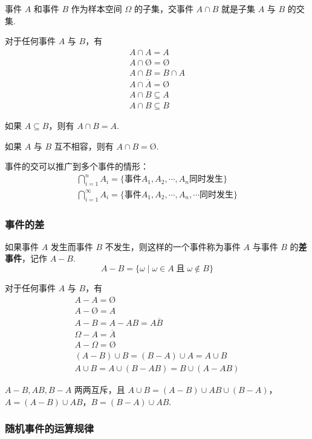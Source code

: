 事件 $A$ 和事件 $B$ 作为样本空间 $\varOmega$ 的子集，交事件 $A \cap B$ 就是子集 $A$ 与 $B$ 的交集.

对于任何事件 $A$ 与 $B$，有
\begin{gather*}
    A \cap A = A\\
    A \cap \text{\O} = \text{\O}\\
    A \cap B = B \cap A\\
    A \cap \overline{A} = \text{\O}\\
    A \cap B \subseteq A\\
    A \cap B \subseteq B
\end{gather*}

如果 $A \subseteq B$，则有 $A \cap B=A$.

如果 $A$ 与 $B$ 互不相容，则有 $A \cap B = \text{\O}$.

事件的交可以推广到多个事件的情形：
\begin{gather*}
    \bigcap_{i=1}^n A_i = \{ \text{事件} A_1,A_2,\cdots,A_n \text{同时发生} \}\\
    \bigcap_{i=1}^\infty A_i = \{ \text{事件} A_1,A_2,\cdots,A_n,\cdots \text{同时发生} \}
\end{gather*}

\subsubsection{事件的差}

如果事件 $A$ 发生而事件 $B$ 不发生，则这样的一个事件称为事件 $A$ 与事件 $B$ 的\textbf{差事件}，记作 $A-B$.
$$
A - B = \{ \omega \mid \omega \in A \;\text{且}\; \omega \notin B \}
$$

对于任何事件 $A$ 与 $B$，有
\begin{gather*}
    A - A = \text{\O}\\
    A - \text{\O} = A\\
    A - B = A - AB = A \overline{B}\\
    \varOmega - A = \overline{A}\\
    A - \varOmega = \text{\O}\\
    (A-B) \cup B = (B-A) \cup A = A \cup B\\
    A \cup B = A \cup (B-AB) = B \cup (A-AB)
\end{gather*}

$A-B,AB,B-A$ 两两互斥，且 $A \cup B = (A-B) \cup AB \cup (B-A)$，$A = (A-B) \cup AB$，$B = (B-A) \cup AB$.

\subsubsection{随机事件的运算规律}

